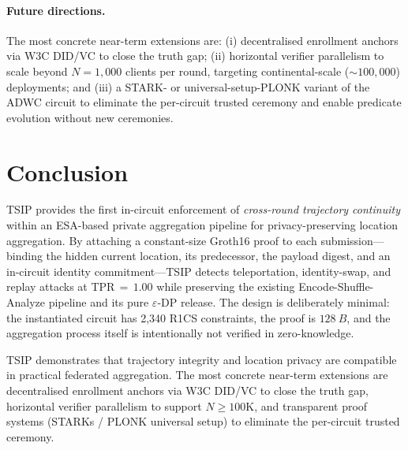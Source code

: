 \documentclass[conference]{IEEEtran}
\theoremstyle{definition}
\theoremstyle{plain}
\begin{document}
\paragraph{Future directions.}
The most concrete near-term extensions are: (i) decentralised enrollment
anchors via W3C DID/VC to close the truth gap; (ii) horizontal verifier
parallelism to scale beyond $N{=}1{,}000$ clients per round, targeting
continental-scale ($\sim\!100{,}000$) deployments; and (iii) a STARK- or
universal-setup-PLONK variant of the ADWC circuit to eliminate the
per-circuit trusted ceremony and enable predicate evolution without new
ceremonies.

\section{Conclusion}
\label{sec:conclusion}

\textsc{TSIP} provides the first in-circuit enforcement of
\emph{cross-round trajectory continuity} within an ESA-based private
aggregation pipeline for privacy-preserving location aggregation. By
attaching a constant-size Groth16 proof to each submission---binding
the hidden current location, its predecessor, the payload digest, and
an in-circuit identity commitment---\textsc{TSIP} detects teleportation,
identity-swap, and replay attacks at TPR$\,=\,1.00$ while preserving
the existing Encode-Shuffle-Analyze pipeline and its pure
$\varepsilon$-DP release.
The design is deliberately minimal: the instantiated circuit has 2{,}340
R1CS constraints, the proof is $\SI{128}{B}$, and the aggregation
process itself is intentionally not verified in zero-knowledge.


TSIP demonstrates that trajectory integrity and location privacy are
compatible in practical federated aggregation.
The most concrete near-term extensions are decentralised enrollment anchors
via W3C DID/VC to close the truth gap, horizontal verifier parallelism
to support $N \geq 100\mathrm{K}$, and transparent proof systems
(STARKs / PLONK universal setup) to eliminate the per-circuit trusted
ceremony.
\end{document}
